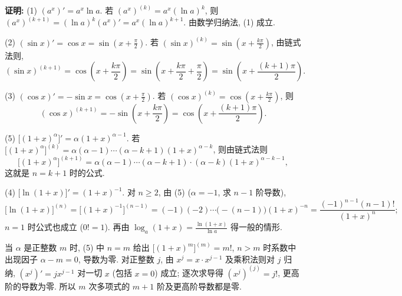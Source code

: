 \documentclass[UTF8,openany]{ctexbook}
\theoremstyle{chinesetextbook}
\newenvironment{cnproof}{\par\indent\textbf{证明:} \ignorespaces}{\par}
\begin{document}
\begin{cnproof}
(1) $(a^x)'=a^x\ln a$. 若 $(a^x)^{(k)}=a^x(\ln a)^k$, 则 $(a^x)^{(k+1)}=(\ln a)^k(a^x)'=a^x(\ln a)^{k+1}$. 由数学归纳法, (1) 成立.

(2) $\displaystyle(\sin x)'=\cos x=\sin\left(x+\frac\pi2\right)$. 若 $\displaystyle(\sin x)^{(k)}=\sin\left(x+\frac{k\pi}2\right)$, 由链式法则,
\[
(\sin x)^{(k+1)}=\cos\left(x+\frac{k\pi}2\right)=\sin\left(x+\frac{k\pi}2+\frac\pi2\right)=\sin\left(x+\frac{(k+1)\pi}2\right).
\]

(3) $\displaystyle(\cos x)'=-\sin x=\cos\left(x+\frac\pi2\right)$. 若 $\displaystyle(\cos x)^{(k)}=\cos\left(x+\frac{k\pi}2\right)$, 则
\[
(\cos x)^{(k+1)}=-\sin\left(x+\frac{k\pi}2\right)=\cos\left(x+\frac{(k+1)\pi}2\right).
\]

(5) $\bigl[(1+x)^\alpha\bigr]'=\alpha(1+x)^{\alpha-1}$. 若 $\bigl[(1+x)^\alpha\bigr]^{(k)}=\alpha(\alpha-1)\cdots(\alpha-k+1)(1+x)^{\alpha-k}$, 则由链式法则
\[
\bigl[(1+x)^\alpha\bigr]^{(k+1)}=\alpha(\alpha-1)\cdots(\alpha-k+1)\cdot(\alpha-k)(1+x)^{\alpha-k-1},
\]
这就是 $n=k+1$ 时的公式.

(4) $\displaystyle\bigl[\ln(1+x)\bigr]'=(1+x)^{-1}$. 对 $n\ge2$, 由 (5) ($\alpha=-1$, 求 $n-1$ 阶导数),
\[
\bigl[\ln(1+x)\bigr]^{(n)}=\bigl[(1+x)^{-1}\bigr]^{(n-1)}=(-1)(-2)\cdots\bigl(-(n-1)\bigr)(1+x)^{-n}=\frac{(-1)^{n-1}(n-1)!}{(1+x)^n};
\]
$n=1$ 时公式也成立 ($0!=1$). 再由 $\displaystyle\log_a(1+x)=\frac{\ln(1+x)}{\ln a}$ 得一般的情形.
\end{cnproof}
当 $\alpha$ 是正整数 $m$ 时, (5) 中 $n=m$ 给出 $\bigl[(1+x)^m\bigr]^{(m)}=m!$, $n>m$ 时系数中出现因子 $\alpha-m=0$, 导数为零. 对正整数 $j$, 由 $x^j=x\cdot x^{j-1}$ 及乘积法则对 $j$ 归纳, $(x^j)'=jx^{j-1}$ 对一切 $x$ (包括 $x=0$) 成立; 逐次求导得 $(x^j)^{(j)}=j!$, 更高阶的导数为零. 所以 $m$ 次多项式的 $m+1$ 阶及更高阶导数都是零.
\end{document}
